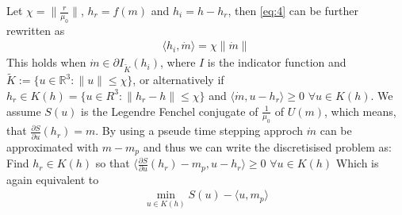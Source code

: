 \documentclass[a4paper,10pt]{article}
\begin{document}
Let $\chi = \|\frac{r}{\mu_0}\|$, $h_r = f(m)$ and $h_i = h - h_r$, then \eqref{eq:4} can be further rewritten as
\begin{align}
    \langle h_i, \dot m \rangle = \chi \|\dot m\|
\end{align}
This holds when $\dot m \in \partial I_{\tilde K}(h_i)$, where $I$ is the indicator
function and $\tilde K := \{u \in \mathbb R^3: \|u\| \leq \chi\}$,
or alternatively if $h_r \in K(h) = \{u \in R^3: \|h_r - h\| \leq \chi \}$ and $\langle \dot m, u - h_r \rangle \geq 0 \,\, \forall u \in K(h)$.
We assume $S(u)$ is the Legendre Fenchel conjugate of $\frac{1}{\mu_0}$ of $U(m)$,
which means, that $\frac{\partial S}{\partial u}(h_r) = m$. By using a pseude time stepping approch $\dot m$ can be approximated with $m - m_p$
and thus we can write the discretisised problem
as: Find $h_r \in K(h)$ so that $\langle \frac{\partial S}{\partial u}(h_r) - m_p,u - h_r \rangle \geq 0 \,\, \forall u \in K(h)$
Which is again equivalent to \begin{align}\min_{u \in K(h)} S(u) - \langle u, m_p \rangle \end{align}
\end{document}
